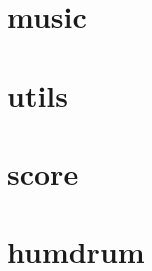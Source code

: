 \documentclass[10pt]{article}
\begin{document}
\section{music}

\newpage
\section{utils}

\newpage
\section{score}

\newpage
\section{humdrum}

\end{document}
